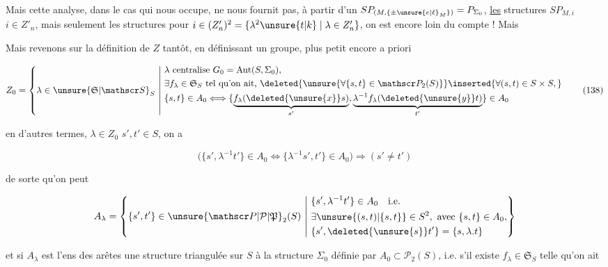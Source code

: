 Mais cette analyse, dans le cas qui nous occupe, ne nous fournit pas, à partir d'un $SP_{(M,\{\pm\unsure{e|\ell}_M\})}=P_{\Sigma_0}$,  \uline{les} structures $SP_{M,i}$ $i\in{Z'_n}$, mais seulement les structures pour $i\in(Z'_n)^2=\{\lambda^2\unsure{t|k}\mid \lambda\in Z'_n\}$, on est encore loin du compte ! Mais



Mais revenons sur la définition de $Z$ tantôt, en définissant un  groupe, plus petit encore a priori

\[
 Z_0=\left\{\lambda\in\unsure{\mathfrak S|\mathscr S}_S\ \middle|\
 \begin{aligned}
 &\lambda\text{ centralise }G_0=\operatorname{Aut}(S,\Sigma_0),\\
 &\exists f_\lambda\in\mathfrak S_S\text{ tel qu'on ait, }
 \deleted{\unsure{\forall\{s,t\}\in\mathscr P_2(S)}}\inserted{\forall(s,t)\in S\times S,}\\
 &\{s,t\}\in A_0\Longleftrightarrow
 \{\underbrace{f_\lambda(\deleted{\unsure{x}}s)}_{s'},\underbrace{\lambda^{-1}f_\lambda(\deleted{\unsure{y}}t)}_{t'}\}\in A_0
 \end{aligned}\right.
 \tag*{(138)}
\]

en d'autres termes, $\lambda\in Z_0$    $s',t'\in S$,  on a

\[
 \bigl(\{s',\lambda^{-1}t'\}\in A_0\Longleftrightarrow
 \{\lambda^{-1}s',t'\}\in A_0\bigr)\Longrightarrow(s'\ne t')
 \tag*{(139)}
\]

de sorte qu'on peut  

\[
 A_\lambda=\left\{\{s',t'\}\in\unsure{\mathscr P|\mathcal P|\mathfrak P}_2(S)\ \middle|\
 \begin{aligned}
 &\{s',\lambda^{-1}t'\}\in A_0\quad\text{i.e.}\\
 &\exists\unsure{(s,t)|\{s,t\}}\in S^2,\ \text{avec }\{s,t\}\in A_0,\\
 &\{s',\deleted{\unsure{s}}t'\}=\{s,\lambda.t\}
 \end{aligned}\right\}
\]

et si $A_\lambda$ est l'ens des arêtes  une structure triangulée sur $S$   à la structure $\Sigma_0$ définie par $A_0\subset\mathscr P_2(S)$, i.e. s'il existe $f_\lambda\in\mathfrak S_S$ telle qu'on ait

